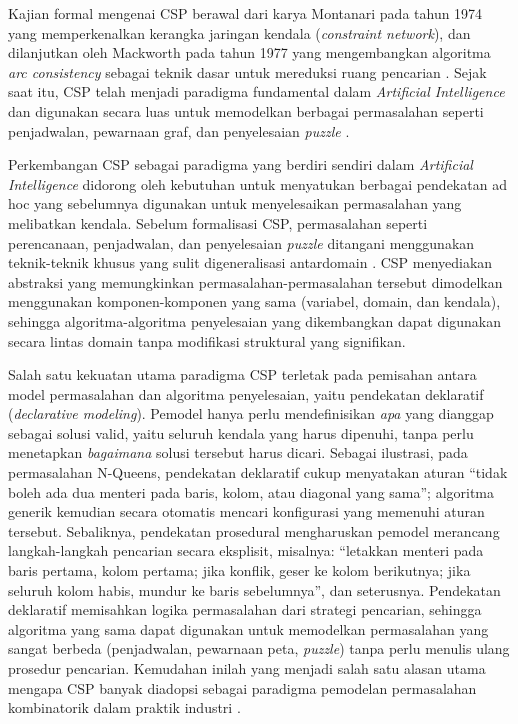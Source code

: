 Kajian formal mengenai CSP berawal dari karya Montanari pada tahun 1974 yang memperkenalkan kerangka jaringan kendala (\textit{constraint network}), dan dilanjutkan oleh Mackworth pada tahun 1977 yang mengembangkan algoritma \textit{arc consistency} sebagai teknik dasar untuk mereduksi ruang pencarian \cite{montanari1974networks}. Sejak saat itu, CSP telah menjadi paradigma fundamental dalam \textit{Artificial Intelligence} dan digunakan secara luas untuk memodelkan berbagai permasalahan seperti penjadwalan, pewarnaan graf, dan penyelesaian \textit{puzzle} \cite{russell2020artificial}.

Perkembangan CSP sebagai paradigma yang berdiri sendiri dalam \textit{Artificial Intelligence} didorong oleh kebutuhan untuk menyatukan berbagai pendekatan ad hoc yang sebelumnya digunakan untuk menyelesaikan permasalahan yang melibatkan kendala. Sebelum formalisasi CSP, permasalahan seperti perencanaan, penjadwalan, dan penyelesaian \textit{puzzle} ditangani menggunakan teknik-teknik khusus yang sulit digeneralisasi antardomain \cite{kumar1998}. CSP menyediakan abstraksi yang memungkinkan permasalahan-permasalahan tersebut dimodelkan menggunakan komponen-komponen yang sama (variabel, domain, dan kendala), sehingga algoritma-algoritma penyelesaian yang dikembangkan dapat digunakan secara lintas domain tanpa modifikasi struktural yang signifikan.

Salah satu kekuatan utama paradigma CSP terletak pada pemisahan antara model permasalahan dan algoritma penyelesaian, yaitu pendekatan deklaratif (\textit{declarative modeling}). Pemodel hanya perlu mendefinisikan \textit{apa} yang dianggap sebagai solusi valid, yaitu seluruh kendala yang harus dipenuhi, tanpa perlu menetapkan \textit{bagaimana} solusi tersebut harus dicari. Sebagai ilustrasi, pada permasalahan N-Queens, pendekatan deklaratif cukup menyatakan aturan ``tidak boleh ada dua menteri pada baris, kolom, atau diagonal yang sama''; algoritma generik kemudian secara otomatis mencari konfigurasi yang memenuhi aturan tersebut. Sebaliknya, pendekatan prosedural mengharuskan pemodel merancang langkah-langkah pencarian secara eksplisit, misalnya: ``letakkan menteri pada baris pertama, kolom pertama; jika konflik, geser ke kolom berikutnya; jika seluruh kolom habis, mundur ke baris sebelumnya'', dan seterusnya. Pendekatan deklaratif memisahkan logika permasalahan dari strategi pencarian, sehingga algoritma yang sama dapat digunakan untuk memodelkan permasalahan yang sangat berbeda (penjadwalan, pewarnaan peta, \textit{puzzle}) tanpa perlu menulis ulang prosedur pencarian. Kemudahan inilah yang menjadi salah satu alasan utama mengapa CSP banyak diadopsi sebagai paradigma pemodelan permasalahan kombinatorik dalam praktik industri \cite{kumar1998}.

